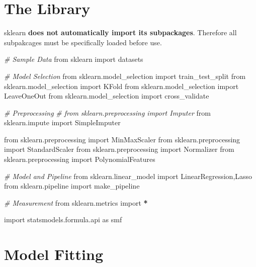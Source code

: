 \documentclass[
]{book}
\newenvironment{Shaded}{\begin{snugshade}}{\end{snugshade}}
\newcommand{\CommentTok}[1]{\textcolor[rgb]{0.37,0.37,0.37}{\textit{#1}}}
\newcommand{\ImportTok}[1]{#1}
\newcommand{\NormalTok}[1]{#1}
\newcommand{\OperatorTok}[1]{\textcolor[rgb]{0.43,0.43,0.43}{\textbf{#1}}}
\begin{document}
\hypertarget{the-library}{%
\section{The Library}\label{the-library}}

sklearn \textbf{does not automatically import its subpackages}. Therefore all subpakcages must be specifically loaded before use.

\begin{Shaded}
\begin{Highlighting}[]
\CommentTok{\# Sample Data}
\ImportTok{from}\NormalTok{ sklearn                 }\ImportTok{import}\NormalTok{ datasets}

\CommentTok{\# Model Selection}
\ImportTok{from}\NormalTok{ sklearn.model\_selection }\ImportTok{import}\NormalTok{ train\_test\_split}
\ImportTok{from}\NormalTok{ sklearn.model\_selection }\ImportTok{import}\NormalTok{ KFold}
\ImportTok{from}\NormalTok{ sklearn.model\_selection }\ImportTok{import}\NormalTok{ LeaveOneOut}
\ImportTok{from}\NormalTok{ sklearn.model\_selection }\ImportTok{import}\NormalTok{ cross\_validate}

\CommentTok{\# Preprocessing}
\CommentTok{\# from sklearn.preprocessing   import Imputer}
\ImportTok{from}\NormalTok{ sklearn.impute }\ImportTok{import}\NormalTok{ SimpleImputer}

\ImportTok{from}\NormalTok{ sklearn.preprocessing   }\ImportTok{import}\NormalTok{ MinMaxScaler}
\ImportTok{from}\NormalTok{ sklearn.preprocessing   }\ImportTok{import}\NormalTok{ StandardScaler}
\ImportTok{from}\NormalTok{ sklearn.preprocessing   }\ImportTok{import}\NormalTok{ Normalizer}
\ImportTok{from}\NormalTok{ sklearn.preprocessing   }\ImportTok{import}\NormalTok{ PolynomialFeatures}

\CommentTok{\# Model and Pipeline}
\ImportTok{from}\NormalTok{ sklearn.linear\_model    }\ImportTok{import}\NormalTok{ LinearRegression,Lasso}
\ImportTok{from}\NormalTok{ sklearn.pipeline        }\ImportTok{import}\NormalTok{ make\_pipeline}

\CommentTok{\# Measurement}
\ImportTok{from}\NormalTok{ sklearn.metrics         }\ImportTok{import} \OperatorTok{*}

\ImportTok{import}\NormalTok{ statsmodels.formula.api }\ImportTok{as}\NormalTok{ smf}
\end{Highlighting}
\end{Shaded}

\hypertarget{model-fitting}{%
\section{Model Fitting}\label{model-fitting}}
\end{document}
